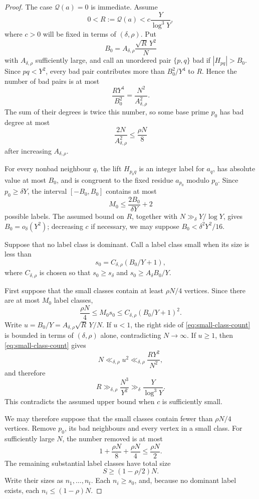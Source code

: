 \begin{proof}
The case $\mathcal Q(a)=0$ is immediate.  Assume
\[
 0<R:=\mathcal Q(a)<c\frac{Y}{\log^3Y},
\]
where $c>0$ will be fixed in terms of $(\delta,\rho)$.  Put
\[
 B_0=A_{\delta,\rho}\frac{\sqrt R\,Y^2}{N}
\]
with $A_{\delta,\rho}$ sufficiently large, and call an unordered pair $\{p,q\}$ bad if $|H_{pq}|>B_0$.  Since $pq<Y^2$, every bad pair contributes more than $B_0^2/Y^4$ to $R$.  Hence the number of bad pairs is at most
\[
 \frac{RY^4}{B_0^2}=\frac{N^2}{A_{\delta,\rho}^2}.
\]
The sum of their degrees is twice this number, so some base prime $p_0$ has bad degree at most
\[
 \frac{2N}{A_{\delta,\rho}^2}\leq\frac{\rho N}{8}
\]
after increasing $A_{\delta,\rho}$.

For every nonbad neighbour $q$, the lift $H_{p_0q}$ is an integer label for $a_q$, has absolute value at most $B_0$, and is congruent to the fixed residue $a_{p_0}$ modulo $p_0$.  Since $p_0\geq\delta Y$, the interval $[-B_0,B_0]$ contains at most
\[
 M_0\leq\frac{2B_0}{\delta Y}+2
\]
possible labels.  The assumed bound on $R$, together with $N\gg_\delta Y/\log Y$, gives $B_0=o_\delta(Y^2)$; decreasing $c$ if necessary, we may suppose $B_0<\delta^2Y^2/16$.

Suppose that no label class is dominant.  Call a label class small when its size is less than
\[
 s_0=C_{\delta,\rho}(B_0/Y+1),
\]
where $C_{\delta,\rho}$ is chosen so that $s_0\geq s_\delta$ and $s_0\geq A_\delta B_0/Y$.

First suppose that the small classes contain at least $\rho N/4$ vertices.  Since there are at most $M_0$ label classes,
\begin{equation}
\label{eq:small-class-count}
 \frac{\rho N}{4}\leq M_0s_0\leq C_{\delta,\rho}(B_0/Y+1)^2.
\end{equation}
Write $u=B_0/Y=A_{\delta,\rho}\sqrt R\,Y/N$.  If $u<1$, the right side of \cref{eq:small-class-count} is bounded in terms of $(\delta,\rho)$ alone, contradicting $N\to\infty$.  If $u\geq1$, then \cref{eq:small-class-count} gives
\[
 N\ll_{\delta,\rho}u^2
 \ll_{\delta,\rho}\frac{RY^2}{N^2},
\]
and therefore
\begin{equation}
\label{eq:small-class-R}
 R\gg_{\delta,\rho}\frac{N^3}{Y^2}
 \gg_\delta\frac{Y}{\log^3Y}.
\end{equation}
This contradicts the assumed upper bound when $c$ is sufficiently small.

We may therefore suppose that the small classes contain fewer than $\rho N/4$ vertices.  Remove $p_0$, its bad neighbours and every vertex in a small class.  For sufficiently large $N$, the number removed is at most
\[
 1+\frac{\rho N}{8}+\frac{\rho N}{4}\leq\frac{\rho N}{2}.
\]
The remaining substantial label classes have total size
\[
 S\geq(1-\rho/2)N.
\]
Write their sizes as $n_1,\ldots,n_t$.  Each $n_i\geq s_0$, and, because no dominant label exists, each $n_i\leq(1-\rho)N$.


\end{proof}
